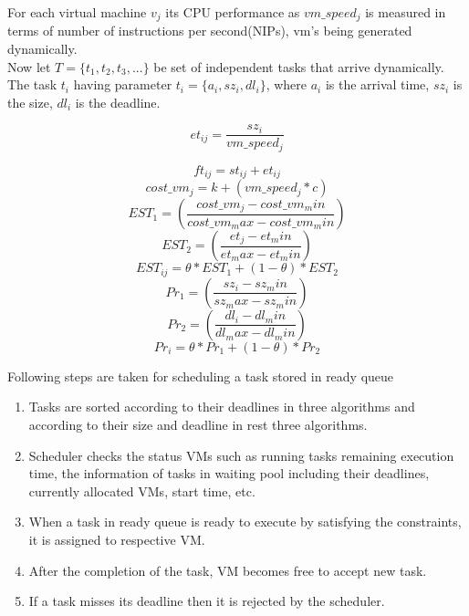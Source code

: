 \documentclass[conference]{IEEEtran}
\begin{document}
\vspace{10pt}For each virtual machine $v_j$ its CPU performance as $vm\_speed_j$ is measured in terms of number of instructions per second(NIPs), vm's being generated dynamically.\\

Now let $T =\{t_1,t_2,t_3, ...\}$ be set of independent tasks that arrive dynamically. The task $t_i$ having parameter $t_i =\{a_i,sz_i,dl_i\}$, where $a_i$ is the arrival time, $sz_i$ is the size, $dl_i$ is the deadline.


\begin{equation}\label{et}
et_{ij} = \frac{sz_i}{vm\_speed_j}
\end{equation}

\begin{equation}\label{ft}
ft_{ij} = st_{ij}+et_{ij}
\end{equation}
\begin{equation}
cost\_vm_j = k+(vm\_speed_j*c)
\end{equation}
\begin{equation}\label{EST1}
EST_1 = \left(\frac{cost\_vm_j-cost\_vm_min}{cost\_vm_max-cost\_vm_min}\right)
\end{equation}
\begin{equation}\label{EST2}
EST_2 = \left(\frac{et_j-et_min}{et_max-et_min}\right)
\end{equation}
\begin{equation}\label{EST}
EST_{ij} = \theta*EST_1+(1-\theta)*EST_2
\end{equation}
\begin{equation}\label{Pr1}
Pr_1 = \left(\frac{sz_i-sz_min}{sz_max-sz_min}\right)
\end{equation}
\begin{equation}\label{Pr2}
Pr_2 = \left(\frac{dl_i-dl_min}{dl_max-dl_min}\right)
\end{equation}
\begin{equation}\label{Pr}
Pr_i = \theta*Pr_1+(1-\theta)*Pr_2
\end{equation}


Following steps are taken for scheduling a task stored in ready queue
\vspace{10pt}
\begin{enumerate}
\item Tasks are sorted according to their deadlines in three algorithms and according to their size and deadline in rest three algorithms.
\item Scheduler checks the status  VMs such
as running tasks remaining execution time, the information
of tasks in waiting pool including their deadlines, currently
allocated VMs, start time, etc.
\item When a task in ready queue is ready to execute by satisfying the constraints, it is
assigned to respective VM.
\item After the completion of the task, VM becomes free to
accept new task.
\item If a task misses its deadline then it is rejected by the
scheduler.
\end{enumerate}
\end{document}
